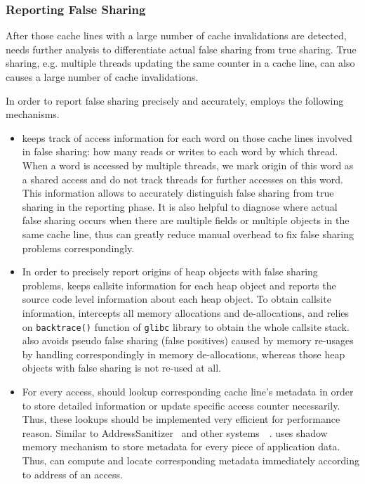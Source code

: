 \subsubsection{Reporting False Sharing}
After those cache lines with a large number of cache invalidations are detected,
\Predator{} needs further analysis to differentiate actual false sharing from true sharing. 
True sharing, e.g. multiple threads updating 
the same counter in a cache line, can also causes a large number of cache invalidations.

In order to report false sharing precisely and accurately,  
\Predator{} employs the following mechanisms. 
\begin{itemize}
\item
\Predator{} keeps track of access information for each word on those
cache lines involved in false sharing: 
how many reads or writes to each word by which thread. 
When a word is accessed by multiple threads,
we mark origin of this word as a shared access and do not track threads for further accesses 
on this word. This information 
allows \Predator{} to accurately distinguish false sharing from true sharing 
in the reporting phase.
It is also helpful to diagnose where 
actual false sharing occurs when there are multiple fields or multiple objects 
in the same cache line, thus can greatly reduce manual overhead to fix false sharing problems
correspondingly. 

\item
In order to precisely report origins of heap objects with false sharing problems, \Predator{}
keeps callsite information for each heap object and reports the source code level
information about each heap object. To obtain callsite information, \Predator{}
intercepts all memory allocations and de-allocations, and relies on \texttt{backtrace()} 
function of \texttt{glibc} library to obtain the whole callsite stack. 
\Predator{} also avoids pseudo false sharing (false positives) caused by memory re-usages 
by handling correspondingly in memory de-allocations, whereas those heap objects with false 
sharing is not re-used at all.

\item
For every access, \Predator{} should lookup corresponding cache line's metadata 
in order to store detailed information or update specific access counter necessarily.
Thus, these lookups should be implemented very efficient for performance reason. 
Similar to 
AddressSanitizer~\cite{Addresssanitizer} and other systems~\cite{qinzhaodetection}~\cite{Valgrind}. 
\Predator{} uses shadow memory mechanism to store metadata for every piece of application data. 
Thus, \Predator{} can compute and locate corresponding metadata immediately according to address of
an access.


\end{itemize}
